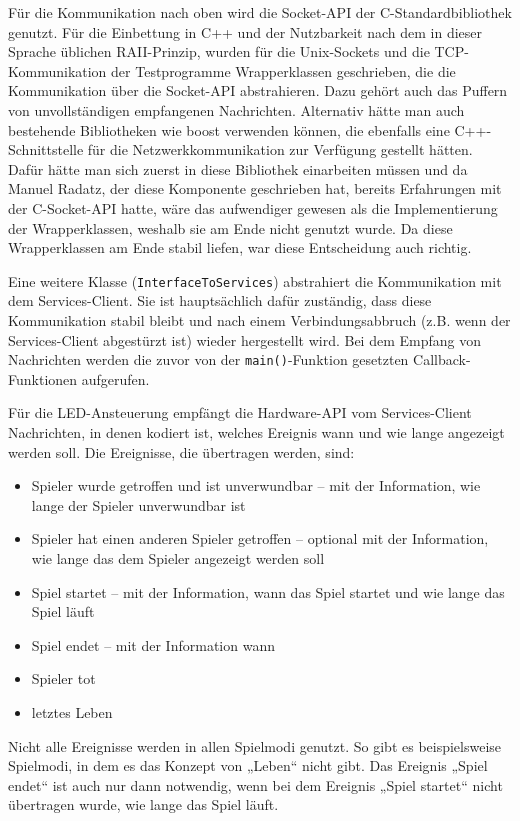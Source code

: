 Für die Kommunikation nach oben wird die Socket-API der C-Standardbibliothek genutzt.
Für die Einbettung in C++ und der Nutzbarkeit nach dem in dieser Sprache üblichen RAII-Prinzip,
wurden für die Unix-Sockets und die TCP-Kommunikation der Testprogramme Wrapperklassen geschrieben,
die die Kommunikation über die Socket-API abstrahieren.
Dazu gehört auch das Puffern von unvollständigen empfangenen Nachrichten.
Alternativ hätte man auch bestehende Bibliotheken wie boost verwenden können, die ebenfalls eine
C++-Schnittstelle für die Netzwerkkommunikation zur Verfügung gestellt hätten.
Dafür hätte man sich zuerst in diese Bibliothek einarbeiten müssen und da Manuel Radatz, der diese
Komponente geschrieben hat, bereits Erfahrungen mit der C-Socket-API hatte, wäre das aufwendiger
gewesen als die Implementierung der Wrapperklassen, weshalb sie am Ende nicht genutzt wurde.
Da diese Wrapperklassen am Ende stabil liefen, war diese Entscheidung auch richtig.

Eine weitere Klasse (\texttt{InterfaceToServices}) abstrahiert die Kommunikation mit dem
Services-Client.
Sie ist hauptsächlich dafür zuständig, dass diese Kommunikation stabil bleibt und nach einem
Verbindungsabbruch (z.B. wenn der Services-Client abgestürzt ist) wieder hergestellt wird.
Bei dem Empfang von Nachrichten werden die zuvor von der \texttt{main()}-Funktion gesetzten
Callback-Funktionen aufgerufen.

Für die LED-Ansteuerung empfängt die Hardware-API vom Services-Client Nachrichten, in denen kodiert
ist, welches Ereignis wann und wie lange angezeigt werden soll.
Die Ereignisse, die übertragen werden, sind:
\begin{itemize}
  \item
    Spieler wurde getroffen und ist unverwundbar – mit der Information, wie lange der Spieler
    unverwundbar ist
  \item
    Spieler hat einen anderen Spieler getroffen – optional mit der Information, wie lange das dem
    Spieler angezeigt werden soll
  \item
    Spiel startet – mit der Information, wann das Spiel startet und wie lange das Spiel läuft
  \item
    Spiel endet – mit der Information wann
  \item
    Spieler tot
  \item
    letztes Leben
\end{itemize}
Nicht alle Ereignisse werden in allen Spielmodi genutzt.
So gibt es beispielsweise Spielmodi, in dem es das Konzept von „Leben“ nicht gibt.
Das Ereignis „Spiel endet“ ist auch nur dann notwendig, wenn bei dem Ereignis „Spiel startet“ nicht
übertragen wurde, wie lange das Spiel läuft.

